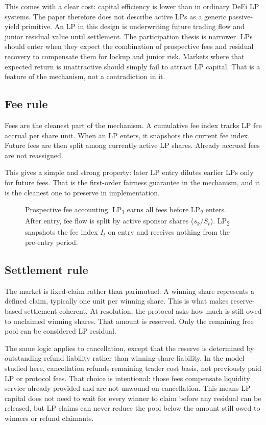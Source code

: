 \documentclass[10pt]{article}
\begin{document}
This comes with a clear cost: capital efficiency is lower than in ordinary DeFi LP systems. The paper therefore does not describe active LPs as a generic passive-yield primitive. An LP in this design is underwriting future trading flow and junior residual value until settlement. The participation thesis is narrower. LPs should enter when they expect the combination of prospective fees and residual recovery to compensate them for lockup and junior risk. Markets where that expected return is unattractive should simply fail to attract LP capital. That is a feature of the mechanism, not a contradiction in it.

\subsection{Fee rule}

Fees are the cleanest part of the mechanism. A cumulative fee index tracks LP fee accrual per share unit. When an LP enters, it snapshots the current fee index. Future fees are then split among currently active LP shares. Already accrued fees are not reassigned.

This gives a simple and strong property: later LP entry dilutes earlier LPs only for future fees. That is the first-order fairness guarantee in the mechanism, and it is the cleanest one to preserve in implementation.

\begin{figure}[t]
\centering
\resizebox{\linewidth}{!}{}
\caption{Prospective fee accounting. LP\textsubscript{1} earns all fees before LP\textsubscript{2} enters. After entry, fee flow is split by active sponsor shares ($s_k / S_t$). LP\textsubscript{2} snapshots the fee index $I_t$ on entry and receives nothing from the pre-entry period.}
\label{fig:fees}
\end{figure}

\subsection{Settlement rule}

The market is fixed-claim rather than parimutuel. A winning share represents a defined claim, typically one unit per winning share. This is what makes reserve-based settlement coherent. At resolution, the protocol asks how much is still owed to unclaimed winning shares. That amount is reserved. Only the remaining free pool can be considered LP residual.

The same logic applies to cancellation, except that the reserve is determined by outstanding refund liability rather than winning-share liability. In the model studied here, cancellation refunds remaining trader cost basis, not previously paid LP or protocol fees. That choice is intentional: those fees compensate liquidity service already provided and are not unwound on cancellation. This means LP capital does not need to wait for every winner to claim before any residual can be released, but LP claims can never reduce the pool below the amount still owed to winners or refund claimants.
\end{document}
